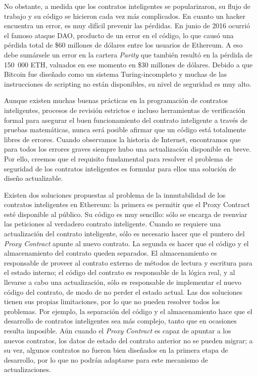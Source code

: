 No obstante, a medida que los contratos inteligentes se popularizaron, su flujo de trabajo y su código se hicieron cada vez más complicados. En cuanto un hacker encuentra un error, es muy difícil prevenir las pérdidas. En junio de 2016 ocurrió el famoso ataque DAO, producto de un error en el código, lo que causó una pérdida total de \$60 millones de dólares entre los usuarios de Ethereum. A eso debe sumársele un error en la cartera \textit{Parity} que también resultó en la pérdida de 150 000 ETH, valuados en ese momento en \$30 millones de dólares. Debido a que Bitcoin fue diseñado como un sistema Turing-incompleto y muchas de las instrucciones de scripting no están disponibles, su nivel de seguridad es muy alto.

Aunque existen muchas buenas prácticas en la programación de contratos inteligentes, procesos de revisión estrictos e incluso herramientas de verificación formal para asegurar el buen funcionamiento del contrato inteligente a través de pruebas matemáticas, nunca será posible afirmar que un código está totalmente libres de errores. Cuando observamos la historia de Internet, encontramos que para todos los errores graves siempre hubo una actualización disponible en breve. Por ello, creemos que el requisito fundamental para resolver el problema de seguridad de los contratos inteligentes es formular para ellos una solución de diseño actualizable.

Existen dos soluciones propuestas al problema de la inmutabilidad de los contratos inteligentes en Ethereum: la primera es permitir que el Proxy Contract esté disponible al público. Su código es muy sencillo: sólo se encarga de reenviar las peticiones al verdadero contrato inteligente. Cuando se requiere una actualización del contrato inteligente, sólo es necesario hacer que el puntero del \textit{Proxy Contract} apunte al nuevo contrato. La segunda es hacer que el código y el almacenamiento del contrato queden separados. El almacenamiento es responsable de proveer al contrato externo de métodos de lectura y escritura para el estado interno; el código del contrato es responsable de la lógica real, y al llevarse a cabo una actualización, sólo es responsable de implementar el nuevo código del contrato, de modo de no perder el estado actual. Las dos soluciones tienen sus propias limitaciones, por lo que no pueden resolver todos los problemas. Por ejemplo, la separación del código y el almacenamiento hace que el desarrollo de contratos inteligentes sea más complejo, tanto que en ocasiones resulta imposible. Aún cuando el \textit{Proxy Contract} es capaz de apuntar a los nuevos contratos, los datos de estado del contrato anterior no se pueden migrar; a su vez, algunos contratos no fueron bien diseñados en la primera etapa de desarrollo, por lo que no podrán adaptarse para este mecanismo de actualizaciones.

